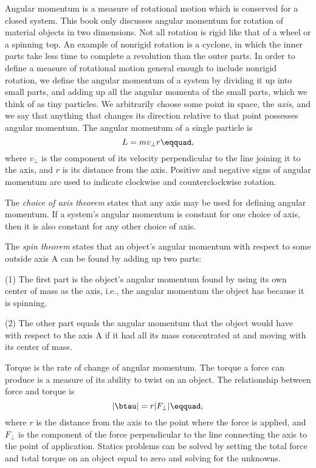 \begin{summary}
\begin{summarytext}

Angular momentum is a measure of rotational motion which is
conserved for a closed system. This book only discusses
angular momentum for rotation of material objects in two
dimensions. Not all rotation is rigid like that of a wheel
or a spinning top. An example of nonrigid rotation is a
cyclone, in which the inner parts take less time to complete
a revolution than the outer parts. In order to define a
measure of rotational motion general enough to include
nonrigid rotation, we define the angular momentum of a
system by dividing it up into small parts, and adding up all
the angular momenta of the small parts, which we think of as
tiny particles. We arbitrarily choose some point in space,
the \emph{axis}, and we say that anything that changes its
direction relative to that point possesses angular momentum.
The angular momentum of a single particle is
\begin{equation*}
                L  =  mv_{\perp}r\eqquad,
\end{equation*}
where $v_{\perp}$ is the component of its velocity perpendicular to
the line joining it to the axis, and $r$ is its distance
from the axis. Positive and negative signs of angular
momentum are used to indicate clockwise and counterclockwise rotation.

The \emph{choice of axis theorem} states that any axis may
be used for defining angular momentum. If a system's angular
momentum is constant for one choice of axis, then it is also
constant for any other choice of axis.

The \emph{spin theorem} states that an object's angular
momentum with respect to some outside axis A can be found by
adding up two parts:

(1) The first part is the object's angular momentum found by
using its own center of mass as the axis, i.e., the angular
momentum the object has because it is spinning.

(2) The other part equals the angular momentum that the
object would have with respect to the axis A if it had all
its mass concentrated at and moving with its center of mass.

Torque is the rate of change of angular momentum. The torque
a force can produce is a measure of its ability to twist on
an object. The relationship between force and torque is
\begin{equation*}
                |\btau |    =    r |F_{\perp} |\eqquad,
\end{equation*}
where $r$ is the distance from the axis to the point where
the force is applied, and $F_{\perp}$ is the component of the force
perpendicular to the line connecting the axis to the point
of application. Statics problems can be solved by setting
the total force and total torque on an object equal to zero
and solving for the unknowns.


\end{summarytext}
\end{summary}
